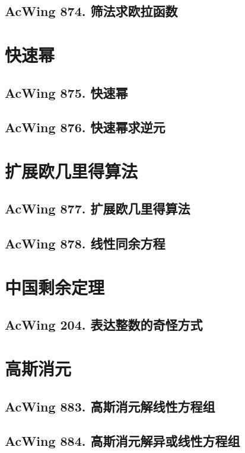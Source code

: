 \subsection{AcWing 874. 筛法求欧拉函数}


\section{快速幂}

\subsection{AcWing 875. 快速幂}

\subsection{AcWing 876. 快速幂求逆元}


\section{扩展欧几里得算法}

\subsection{AcWing 877. 扩展欧几里得算法}

\subsection{AcWing 878. 线性同余方程}


\section{中国剩余定理}

\subsection{AcWing 204. 表达整数的奇怪方式}


\section{高斯消元}

\subsection{AcWing 883. 高斯消元解线性方程组}

\subsection{AcWing 884. 高斯消元解异或线性方程组}


